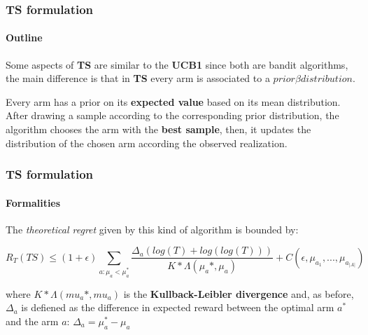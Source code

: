 \begin{frame}

\frametitle{TS formulation}
\framesubtitle{Outline}

Some aspects of \textbf{TS} are similar to the \textbf{UCB1} since both are bandit algorithms, the main difference is that in \textbf{TS} every arm is associated to a $prior \beta distribution$.

Every arm has a prior on its \textbf{expected value} based on its mean distribution.
After drawing a sample according to the corresponding prior distribution, the algorithm chooses the arm with the \textbf{best sample}, then, it updates the distribution of the chosen arm according the observed realization.

\end{frame}


\begin{frame}[fragile]

\frametitle{TS formulation}
\framesubtitle{Formalities}


The \textit{theoretical regret} given by this kind of algorithm is bounded by:

\begin{displaymath}
    R_T(TS) \le (1+\epsilon) \sum_{a:\mu_a < \mu_a^*} \frac{\Delta_a(log(T)+log(log(T)))}{K*\Lambda(\mu_a*, \mu_a)} + C (\epsilon, \mu_{a_1} , ... , \mu_{a_{\left|A\right|}})
\end{displaymath}

where $K*\Lambda(mu_a*,mu_a)$ is the \textbf{Kullback-Leibler divergence} and, as before, $\Delta_a$ is defiened as the difference in expected reward between the optimal arm $a^*$ and the arm $a$: $\Delta_a = \mu_a^* - \mu_a$

\end{frame}

